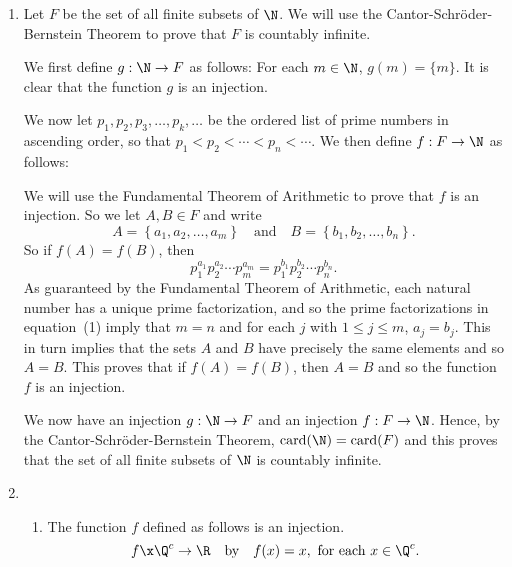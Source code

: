 \begin{enumerate}
\item Let $F$ be the set of all finite subsets of $\N$.  We will use the Cantor-Schr\"{o}der-Bernstein Theorem to prove that $F$ is countably infinite.

\newpar
We first define $g: \N \to F$ as follows:  For each $m \in \N$,  $g(m) = \{ m \}$.  It is clear that the function $g$ is an injection.

\newpar
We now let $p_1, p_2, p_3, \ldots, p_k, \ldots$ be the ordered list of prime numbers in ascending order, so that $p_1 < p_2 < \cdots < p_n < \cdots$.  We then define $f: F \to \N$ as follows:

We will use the Fundamental Theorem of Arithmetic to prove that $f$ is an injection.  So we let $A, B \in F$ and write
\[
A = \left\{ a_1, a_2, \ldots, a_m \right\} \quad \text{and} \quad B = \left\{ b_1, b_2, \ldots, b_n \right\}.
\]
\setcounter{equation}{0}
So if $f(A) = f(B)$, then
\begin{equation}
p_1^{a_1} p_2^{a_2} \cdots p_m^{a_m} = p_1^{b_1} p_2^{b_2} \cdots p_n^{b_n}.
\end{equation}
As guaranteed by the Fundamental Theorem of Arithmetic, each natural number has a unique prime factorization, and so the prime factorizations in equation~(1) imply that $m = n$ and for each $j$ with $1 \leq j \leq m$, 
$a_j = b_j$.  This in turn implies that the sets $A$ and $B$ have precisely the same elements and so 
$A = B$.  This proves that if $f(A) = f(B)$, then $A = B$ and so the function $f$ is an injection.

\newpar
We now have an injection $g:\N \to F$ and an injection $f:F \to \N$.  Hence, by the 
Cantor-Schr\"{o}der-Bernstein Theorem, $\text{card}(\N) = \text{card}(F)$ and this proves that the set of all finite subsets of $\N$ is countably infinite.





\item \begin{enumerate}
\item The function $f$ defined as follows is an injection.
\[
f\x \Q^c \to \R \quad \text{by} \quad f(x) = x, \text{ for each } x \in \Q^c.
\]


\end{enumerate}
\end{enumerate}
